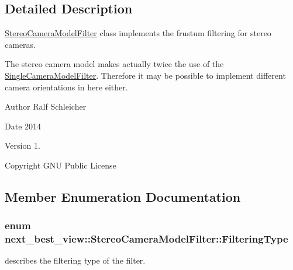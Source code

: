 \subsection{\-Detailed \-Description}
\hyperlink{classnext__best__view_1_1StereoCameraModelFilter}{\-Stereo\-Camera\-Model\-Filter} class implements the frustum filtering for stereo cameras. 

\-The stereo camera model makes actually twice the use of the \hyperlink{classnext__best__view_1_1SingleCameraModelFilter}{\-Single\-Camera\-Model\-Filter}. \-Therefore it may be possible to implement different camera orientations in here either. \begin{DoxyAuthor}{\-Author}
\-Ralf \-Schleicher 
\end{DoxyAuthor}
\begin{DoxyDate}{\-Date}
2014 
\end{DoxyDate}
\begin{DoxyVersion}{\-Version}
1. 
\end{DoxyVersion}
\begin{DoxyCopyright}{\-Copyright}
\-G\-N\-U \-Public \-License 
\end{DoxyCopyright}


\subsection{\-Member \-Enumeration \-Documentation}
\hypertarget{classnext__best__view_1_1StereoCameraModelFilter_a60feeec608139dd1bc248f43b7a0b9bc}{
\subsubsection[{\-Filtering\-Type}]{\setlength{\rightskip}{0pt plus 5cm}enum {\bf next\-\_\-best\-\_\-view\-::\-Stereo\-Camera\-Model\-Filter\-::\-Filtering\-Type}}}\label{classnext__best__view_1_1StereoCameraModelFilter_a60feeec608139dd1bc248f43b7a0b9bc}


describes the filtering type of the filter. 

